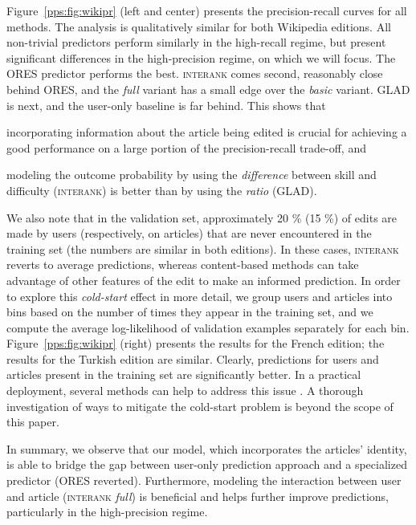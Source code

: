 Figure~\ref{pps:fig:wikipr} (left and center) presents the precision-recall curves for all methods.
The analysis is qualitatively similar for both Wikipedia editions.
All non-trivial predictors perform similarly in the high-recall regime, but present significant differences in the high-precision regime, on which we will focus.
The ORES predictor performs the best.
\textsc{interank} comes second, reasonably close behind ORES, and the \emph{full} variant has a small edge over the \emph{basic} variant.
GLAD is next, and the user-only baseline is far behind.
This shows that
\begin{enuminline}
	\item incorporating information about the article being edited is crucial for achieving a good performance on a large portion of the precision-recall trade-off, and
	\item modeling the outcome probability by using the \emph{difference} between skill and difficulty (\textsc{interank}) is better than by using the \emph{ratio} (GLAD).
\end{enuminline}


We also note that in the validation set, approximately \num{20} \% (\num{15} \%) of edits are made by users (respectively, on articles) that are never encountered in the training set (the numbers are similar in both editions).
In these cases, \textsc{interank} reverts to average predictions, whereas content-based methods can take advantage of other features of the edit to make an informed prediction.
In order to explore this \emph{cold-start} effect in more detail, we group users and articles into bins based on the number of times they appear in the training set, and we compute the average log-likelihood of validation examples separately for each bin.
Figure~\ref{pps:fig:wikipr} (right) presents the results for the French edition;
the results for the Turkish edition are similar.
Clearly, predictions for users and articles present in the training set are significantly better.
In a practical deployment, several methods can help to address this issue \citep{schein2002methods, lam2008addressing, levi2012finding}.
A thorough investigation of ways to mitigate the cold-start problem is beyond the scope of this paper.

In summary, we observe that our model, which incorporates the articles' identity, is able to bridge the gap between user-only prediction approach and a specialized predictor (ORES reverted).
Furthermore, modeling the interaction between user and article (\textsc{interank} \emph{full}) is beneficial and helps further improve predictions, particularly in the high-precision regime.


